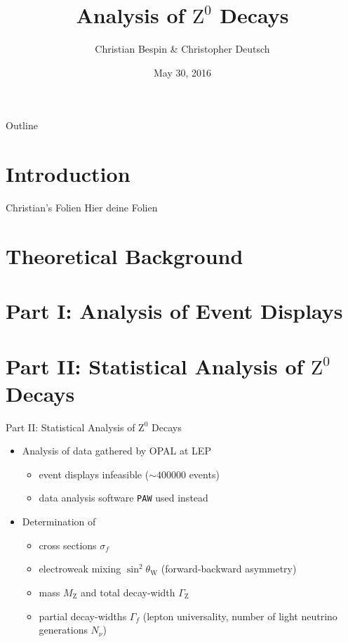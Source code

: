 \documentclass[11pt,xcolor=dvipsnames,professionalfonts]{beamer}
\author[Christian Bespin \& Christopher Deutsch]
{Christian Bespin \& Christopher Deutsch}
\title
{Analysis of $\mathrm{Z}^0$ Decays}
\subtitle
{}
\institute[]
{Advanced Laboratory Course\\ Summer Term 16}
\date{May 30, 2016}
\begin{document}
\maketitle


\begin{frame}{Outline}
	\tableofcontents
\end{frame}

\section{Introduction}
\begin{frame}{Christian's Folien}
	Hier deine Folien
\end{frame}

\section{Theoretical Background}

\section{Part I: Analysis of Event Displays}

\section{Part II: Statistical Analysis of $\mathrm{Z}^0$ Decays}
\begin{frame}{Part II: Statistical Analysis of $\mathrm{Z}^0$ Decays}
	\begin{itemize}
		\setlength\itemsep{2.em}
		\item Analysis of data gathered by OPAL at LEP
		\begin{itemize}
			\setlength\itemsep{0.5em}
			\item event displays infeasible ($\sim \num{400000}$ events)
			\item data analysis software \texttt{PAW} used instead
		\end{itemize}
		
		\item Determination of
		\begin{itemize}
			\setlength\itemsep{0.5em}
			\item cross sections $\sigma_f$
			
			\item electroweak mixing $\sin^2\theta_\mathrm{W}$ (forward-backward asymmetry)
			
			\item mass $M_\mathrm{Z}$ and total decay-width $\Gamma_\mathrm{Z}$
			
			\item partial decay-widths $\Gamma_f$ (lepton universality, number of light neutrino generations $N_\nu$)
		\end{itemize}
	\end{itemize}
\end{frame}
\end{document}
